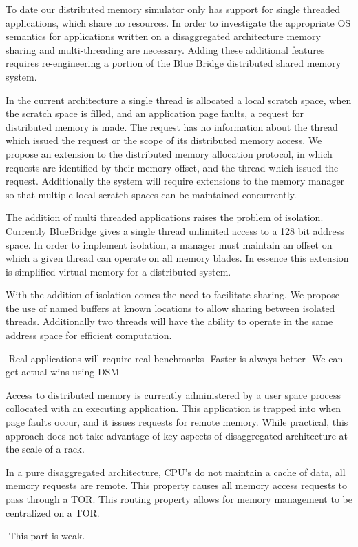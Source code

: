 
To date our distributed memory simulator only has support for single
threaded applications, which share no resources. In order to
investigate the appropriate OS semantics for applications written on a
disaggregated architecture memory sharing and multi-threading are
necessary. Adding these additional features requires re-engineering a
portion of the Blue Bridge distributed shared memory system.

In the current architecture a single thread is allocated a local
scratch space, when the scratch space is filled, and an application
page faults, a request for distributed memory is made. The request has
no information about the thread which issued the request or the scope
of its distributed memory access. We propose an extension to the
distributed memory allocation protocol, in which requests are
identified by their memory offset, and the thread which issued the
request. Additionally the system will require extensions to the memory
manager so that multiple local scratch spaces can be maintained
concurrently.

The addition of multi threaded applications raises the problem of
isolation. Currently BlueBridge gives a single thread unlimited access
to a 128 bit address space. In order to implement isolation, a manager
must maintain an offset on which a given thread can operate on all
memory blades. In essence this extension is simplified virtual memory
for a distributed system.

With the addition of isolation comes the need to facilitate sharing.
We propose the use of named buffers at known locations to allow
sharing between isolated threads. Additionally two threads will have
the ability to operate in the same address space for efficient
computation.

-Real applications will require real benchmarks
-Faster is always better
-We can get actual wins using DSM


 Access to distributed memory is currently administered by a
user space process collocated with an executing application. This
application is trapped into when page faults occur, and it issues
requests for remote memory. While practical, this approach does not
take advantage of key aspects of disaggregated architecture at the
scale of a rack.

In a pure disaggregated architecture, CPU’s do not maintain a cache of
data, all memory requests are remote. This property causes all memory
access requests to pass through a TOR. This routing property allows
for memory management to be centralized on a TOR.

-This part is weak.

